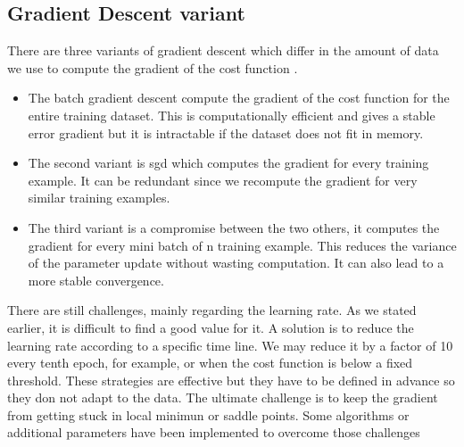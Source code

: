 \subsection{Gradient Descent variant}
There are three variants of gradient descent which differ in the amount of data we use to compute the gradient of the cost function \cite{gradient}. 
\begin{itemize}
    \item The batch gradient descent compute the gradient of the cost function for the entire training dataset. This is computationally efficient and gives a stable error gradient but it is intractable if the dataset does not fit in memory. 
    \item The second variant is \gls{sgd} which computes the gradient for every training example. It can be redundant since we recompute the gradient for very similar training examples.
    \item The third variant is a compromise between the two others, it computes the gradient for every mini batch of n training example. This reduces the variance of the parameter update without wasting computation. It can also lead to a more stable convergence.
\end{itemize}There are still challenges, mainly regarding the learning rate. As we stated earlier, it is difficult to find a good value for it. A solution is to reduce the learning rate according to a specific time line. We may reduce it by a factor of 10 every tenth epoch, for example, or when the cost function is below a fixed threshold. These strategies are effective but they have to be defined in advance so they don not adapt to the data. The ultimate challenge is to keep the gradient from getting stuck in local minimun or saddle points. Some algorithms or additional parameters have been implemented to overcome those challenges
